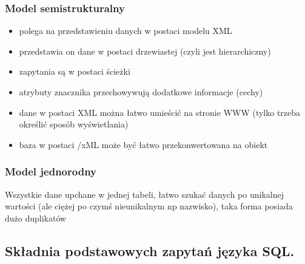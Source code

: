 \documentclass[a4paper,12pt,oneside]{book}
\begin{document}
			\subsubsection{Model semistrukturalny}
			\begin{itemize}
				\itemsep 0em
				\item polega na przedstawieniu danych w postaci modelu XML		
				\item przedstawia on dane w postaci drzewiastej (czyli jest hierarchiczny)
				\item zapytania są w postaci ścieżki
				\item atrybuty znacznika przechowywują dodatkowe informacje (cechy)
				\item dane w postaci XML można łatwo umieścić na stronie WWW (tylko trzeba określić sposób wyświetlania)
				\item baza w postaci /xML może być łatwo przekonwertowana na obiekt
			\end{itemize}
			
			\subsubsection{Model jednorodny}
			Wszystkie dane upchane w jednej tabeli, łatwo szukać danych po unikalnej wartości (ale ciężej po czymś nieunikalnym np nazwisko), taka forma posiada dużo duplikatów
				
			\newpage\subsection{Składnia podstawowych zapytań języka SQL.}
\end{document}
